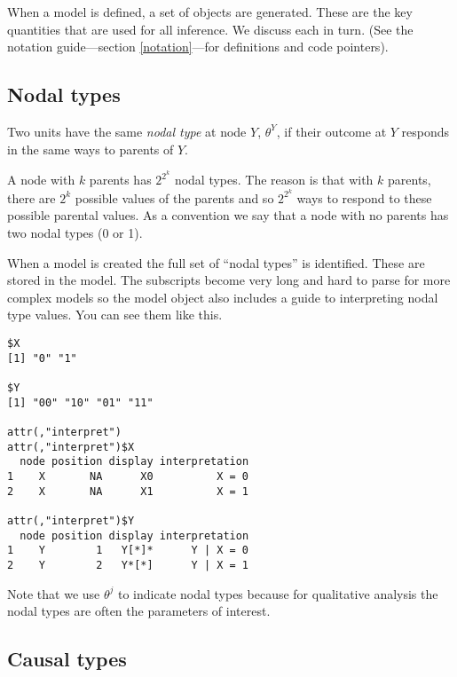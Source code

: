 \documentclass[
  12pt,
]{book}
\newenvironment{Shaded}{\begin{snugshade}}{\end{snugshade}}
\newcommand{\KeywordTok}[1]{\textcolor[rgb]{0.13,0.29,0.53}{\textbf{#1}}}
\newcommand{\NormalTok}[1]{#1}
\newcommand{\OperatorTok}[1]{\textcolor[rgb]{0.81,0.36,0.00}{\textbf{#1}}}
\newcommand{\StringTok}[1]{\textcolor[rgb]{0.31,0.60,0.02}{#1}}
\begin{document}
When a model is defined, a set of objects are generated. These are the key quantities that are used for all inference. We discuss each in turn. (See the notation guide---section \ref{notation}---for definitions and code pointers).

\hypertarget{nodal-types}{%
\subsection{Nodal types}\label{nodal-types}}

Two units have the same \emph{nodal type} at node \(Y\), \(\theta^Y\), if their outcome at \(Y\) responds in the same ways to parents of \(Y\).

A node with \(k\) parents has \(2^{2^k}\) nodal types. The reason is that with \(k\) parents, there are \(2^k\) possible values of the parents and so \(2^{2^k}\) ways to respond to these possible parental values. As a convention we say that a node with no parents has two nodal types (0 or 1).

When a model is created the full set of ``nodal types'' is identified. These are stored in the model. The subscripts become very long and hard to parse for more complex models so the model object also includes a guide to interpreting nodal type values. You can see them like this.

\begin{Shaded}
\end{Shaded}

\begin{verbatim}
$X
[1] "0" "1"

$Y
[1] "00" "10" "01" "11"

attr(,"interpret")
attr(,"interpret")$X
  node position display interpretation
1    X       NA      X0          X = 0
2    X       NA      X1          X = 1

attr(,"interpret")$Y
  node position display interpretation
1    Y        1   Y[*]*      Y | X = 0
2    Y        2   Y*[*]      Y | X = 1
\end{verbatim}

Note that we use \(\theta^j\) to indicate nodal types because for qualitative analysis the nodal types are often the parameters of interest.

\hypertarget{causal-types}{%
\subsection{Causal types}\label{causal-types}}
\end{document}
